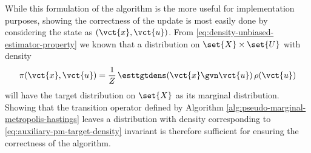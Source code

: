 While this formulation of the algorithm is the more useful for implementation purposes, showing the correctness of the update is most easily done by considering the state as $(\vct{x},\vct{u})$. From \eqref{eq:density-unbiased-estimator-property} we known that a distribution on $\set{X}\times\set{U}$ with density
\begin{equation}\label{eq:auxiliary-pm-target-density}
  \pi(\vct{x},\vct{u}) = \frac{1}{Z} \,\esttgtdens(\vct{x}\gvn\vct{u})\,\rho(\vct{u})
\end{equation}
will have the target distribution on $\set{X}$ as its marginal distribution. Showing that the transition operator defined by Algorithm \ref{alg:pseudo-marginal-metropolis-hastings} leaves a distribution with density corresponding to \eqref{eq:auxiliary-pm-target-density} invariant is therefore sufficient for ensuring the correctness of the algorithm.

